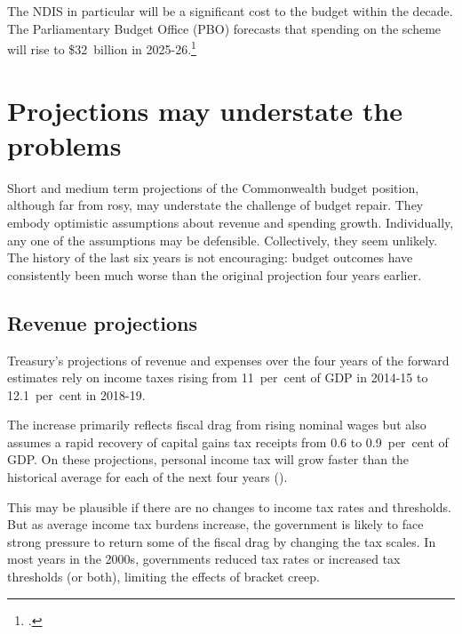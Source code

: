 \documentclass[twoside,english]{palatinob5ona4portrait}
\begin{document}
The NDIS in particular will be a significant cost to the budget within the decade. The Parliamentary Budget Office (PBO) forecasts that spending on the scheme will rise to \$32~billion in 2025-26.\footcite[][5]{PBO2015} 

\section{Projections may understate the problems\label{sec:FISCAL-3-3}}
Short and medium term projections of the Commonwealth budget position, although far from rosy, may understate the challenge of budget repair. They embody optimistic assumptions about revenue and spending growth. Individually, any one of the assumptions may be defensible. Collectively, they seem unlikely. The history of the last six years is not encouraging: budget outcomes have consistently been much worse than the original projection four years earlier.

\subsection{Revenue projections}
Treasury’s projections of revenue and expenses over the four years of the forward estimates rely on income taxes rising from 11~per~cent of GDP in 2014-15 to 12.1~per~cent in 2018-19. 

The increase primarily reflects fiscal drag from rising nominal wages but also assumes a rapid recovery of capital gains tax receipts from 0.6 to 0.9~per~cent of GDP\@. On these projections, personal income tax will grow faster than the historical average for each of the next four years ().

This may be plausible if there are no changes to income tax rates and thresholds. But as average income tax burdens increase, the government is likely to face strong pressure to return some of the fiscal drag by changing the tax scales. In most years in the 2000s, governments reduced tax rates or increased tax thresholds (or both), limiting the effects of bracket creep. 
\end{document}
